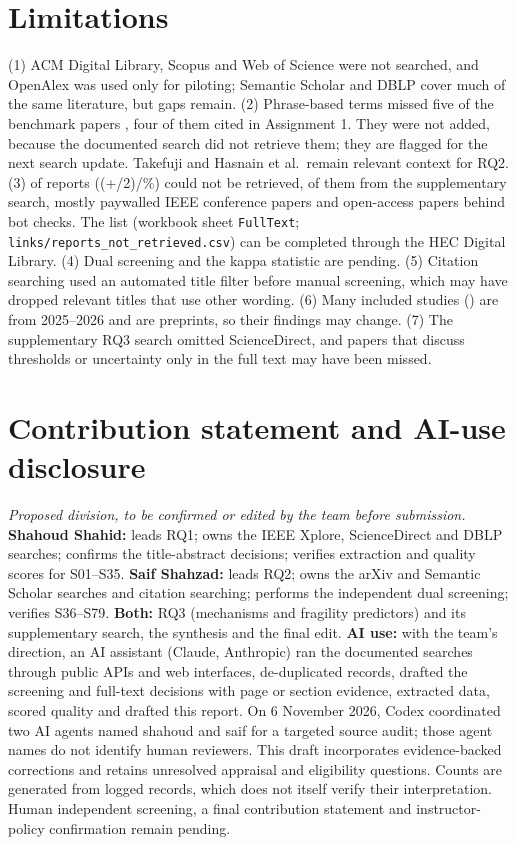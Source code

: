 \section{Limitations}\label{sec:lim}
(1) ACM Digital Library, Scopus and Web of Science were not searched, and OpenAlex was used only for piloting; Semantic Scholar and DBLP cover much of the same literature, but gaps remain. (2) Phrase-based terms missed five of the \nKnown{} benchmark papers \cite{hwang2025,decker2025,lin2023,takefuji2025,hasnain2026}, four of them cited in Assignment 1. They were not added, because the documented search did not retrieve them; they are flagged for the next search update. Takefuji and Hasnain et al.\ remain relevant context for RQ2. (3) \totalNotRetrieved{} of \totalSought{} reports (\the\numexpr(+\totalSought/2)/\totalSought\relax\%) could not be retrieved, \spNotRetrieved{} of them from the supplementary search, mostly paywalled IEEE conference papers and open-access papers behind bot checks. The list (workbook sheet \texttt{FullText}; \texttt{links/reports\_not\_retrieved.csv}) can be completed through the HEC Digital Library. (4) Dual screening and the kappa statistic are pending. (5) Citation searching used an automated title filter before manual screening, which may have dropped relevant titles that use other wording. (6) Many included studies (\incSinceTwentyFive{}) are from 2025--2026 and \incPreprint{} are preprints, so their findings may change. (7) The supplementary RQ3 search omitted ScienceDirect, and papers that discuss thresholds or uncertainty only in the full text may have been missed.

\section{Contribution statement and AI-use disclosure}\label{sec:contrib}
\textit{Proposed division, to be confirmed or edited by the team before submission.} \textbf{Shahoud Shahid:} leads RQ1; owns the IEEE Xplore, ScienceDirect and DBLP searches; confirms the title-abstract decisions; verifies extraction and quality scores for S01--S35. \textbf{Saif Shahzad:} leads RQ2; owns the arXiv and Semantic Scholar searches and citation searching; performs the independent dual screening; verifies S36--S79. \textbf{Both:} RQ3 (mechanisms and fragility predictors) and its supplementary search, the synthesis and the final edit. \textbf{AI use:} with the team's direction, an AI assistant (Claude, Anthropic) ran the documented searches through public APIs and web interfaces, de-duplicated records, drafted the screening and full-text decisions with page or section evidence, extracted data, scored quality and drafted this report. On 6 November 2026, Codex coordinated two AI agents named shahoud and saif for a targeted source audit; those agent names do not identify human reviewers. This draft incorporates evidence-backed corrections and retains unresolved appraisal and eligibility questions. Counts are generated from logged records, which does not itself verify their interpretation. Human independent screening, a final contribution statement and instructor-policy confirmation remain pending.

